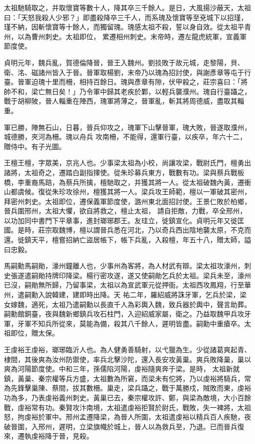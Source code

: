 \begin{pinyinscope}
 太祖馳騎取之，并取懷寶等數十人，降其卒三千餘人。是日，大風揚沙蔽天，太祖曰：「天怒我殺人少邪？」即盡殺降卒三千人，而系瑰及懷寶等至兗城下以招瑾，瑾不納，因斬懷寶等十餘人，而獨留瑰。瑰感太祖不殺，誓以身自效。從太祖平青州，以為曹州刺史。太祖即位，
 累遷相州刺史。末帝時，遷左龍虎統軍，宣義軍節度使。



 貞明元年，魏兵亂，賀德倫降晉，晉王入魏州。劉掞敗于故元城，走黎陽，貝、衛、洺、磁諸州皆入于晉。晉軍取楊劉，末帝乃以瑰為招討使，與謝彥章等屯于行臺。晉軍迫瑰十里而柵，相持百餘日。瑰與彥章有隙，伏甲殺之，莊宗喜曰：「將帥不和，梁亡無日矣！」乃令軍中歸其老疾於鄴，以輕兵襲濮州。瑰自行臺躡之，戰于胡柳陂，晉人輜重在陣西，瑰軍將薄之，晉軍亂，斬其將周德威，盡取其輜重。



 軍已勝，陣無石山，日暮，晉兵仰攻之，瑰軍下山擊晉軍，瑰大敗，晉遂取濮州，城德勝，夾河為柵。瑰以舟兵
 攻南柵，不能得，還軍行臺，以疾卒，年六十二，贈侍中。有子光圖。



 王檀王檀，字眾美，京兆人也。少事梁太祖為小校，尚讓攻梁，戰尉氏門，檀勇出諸將，太祖奇之，遷踏白副指揮使。從朱珍募兵東方，戰數有功。梁與蔡兵戰板橋，李重裔馬踣，為蔡兵所擒，檀馳取之，并獲其將一人。從太祖破魏內黃，遷衝山都虞候。復從朱珍攻徐州，檀獲其將一人。梁兵攻王師範，檀以一軍破其密州，拜密州刺史。太祖即位，遷保義軍節度使，潞州東北面招討使。王景仁敗於柏鄉，晉兵圍邢州，太祖大懼，欲自將救之，檀止太祖，
 請自拒敵，力戰，卒全邢州，以功加同中書門下平章事，進封瑯琊郡王。友珪立，徙鎮宣化。貞明元年又徙匡國。是時，莊宗取魏博，檀以謂晉兵悉在河北，乃以奇兵西出陰地襲太原，不克而還。徙鎮天平，檀嘗招納亡盜居帳下，帳下兵亂，入殺檀，年五十八，贈太師，謚曰忠毅。



 馬嗣勳馬嗣勛，濠州鐘離人也，少事州為客將，為人材武有辯。梁太祖攻濠州，刺史張遂遣嗣勛持牌印降梁。楊行密攻遂，遂又使嗣勛乞兵於太祖。梁兵未至，濠州已沒，嗣勛無所歸，乃留事梁，太祖以為宣武軍元從押衙。太祖西攻鳳翔，行至華州，遣嗣勳入說韓建，建即時出降。天
 祐二年，羅紹威將誅牙軍，乞兵於梁，梁女嫁魏，適死，太祖乃遣嗣勳以長直千人為彩輿入魏，致兵器於輿中，聲言助葬。嗣勳館銅臺，夜與魏新鄉鎮兵攻石柱門，入迎紹威家屬，衛之。乃益取魏甲兵攻牙軍，牙軍不知兵所從來，莫能為備，殺其八千餘人，遲明皆盡。嗣勳中重瘡卒。太祖即位，贈太保。



 王虔裕王虔裕，瑯琊臨沂人也。為人健勇善騎射，以弋獵為生。少從諸葛爽起青、棣間，其後爽為汝州防禦使，率兵北擊沙陀，還入長安攻黃巢。爽兵敗降巢，巢以爽為河陽節度使。中和三年，孫儒陷河陽，虔裕隨爽奔于梁。是時，
 太祖新就鎮，黃巢、秦宗權等兵方盛，太祖數為所窘，而梁未有佗將，乃以虔裕將騎兵，常為先鋒擊巢陳、蔡間，拔其數柵。巢走，梁兵躡之，戰于萬勝戍，賊敗而東，虔裕功為多，乃表虔裕義州刺史。黃巢已去，秦宗權攻許、鄭，與梁為敵境，大小百餘戰，虔裕常有功。秦賢攻汴南境，太祖遣虔裕拒賢於尉氏，戰敗，失一裨將，太祖怒，拘虔裕於軍中。邢州孟遷降梁，為晉人所圍，太祖遣虔裕以精兵百人疾馳，夜破晉圍，入邢州，遲明，立梁旗幟於城上，晉人以為救兵至，乃退。已而晉兵復來，遷執虔裕降于晉，見殺。




\end{pinyinscope}
